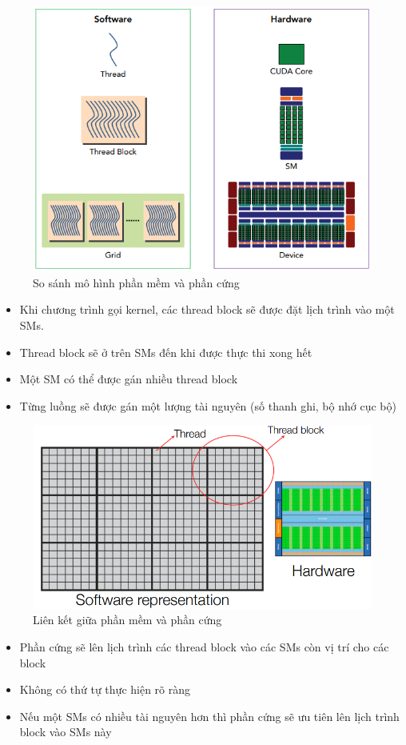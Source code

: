 \documentclass[14pt, a4paper]{article}
\numberwithin{equation}{section}
\numberwithin{figure}{section}
\numberwithin{dl}{section}
\numberwithin{md}{section}
\numberwithin{bd}{section}
\numberwithin{dn}{section}
\numberwithin{hq}{section}
\begin{document}
\begin{figure}[H]
    \centering
    \includegraphics[width=0.7\linewidth]{figures/CUDA/Software_vs_Hardware.png}
    \caption{So sánh mô hình phần mềm và phần cứng}
\end{figure}

\begin{itemize}
    \item Khi chương trình gọi kernel, các thread block sẽ được đặt lịch trình vào một SMs.
    \item Thread block sẽ ở trên SMs đến khi được thực thi xong hết
    \item Một SM có thể được gán nhiều thread block
    \item Từng luồng sẽ được gán một lượng tài nguyên (số thanh ghi, bộ nhớ cục bộ)
\end{itemize}

\begin{figure}[H]
    \centering
    \includegraphics[width=0.85\linewidth]{figures/CUDA/Connecting_SW_HW_1.png}
    \caption{Liên kết giữa phần mềm và phần cứng}
\end{figure}

\begin{itemize}
    \item Phần cứng sẽ lên lịch trình các thread block vào các SMs còn vị trí cho các block 
    \item Không có thứ tự thực hiện rõ ràng
    \item Nếu một SMs có nhiều tài nguyên hơn thì phần cứng sẽ ưu tiên lên lịch trình block vào SMs này
\end{itemize}
\end{document}
